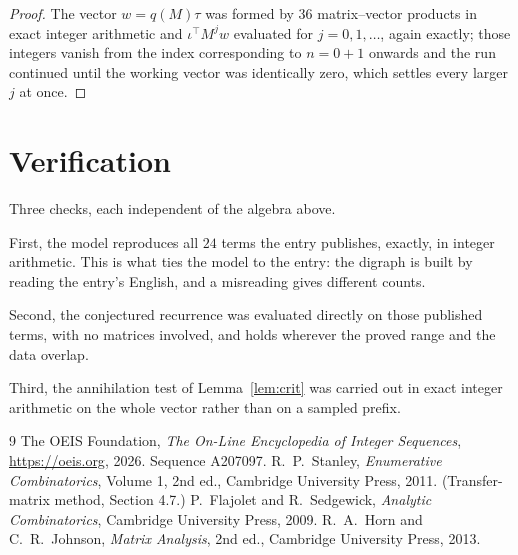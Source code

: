 \documentclass[11pt,a4paper]{article}
\theoremstyle{plain}
\theoremstyle{definition}
\begin{document}
\begin{proof}
The vector $w=q(M)\tau$ was formed by $36$ matrix--vector products in exact integer
arithmetic and $\iota^{\!\top}M^{j}w$ evaluated for $j=0,1,\dots$, again exactly; those
integers vanish from the index corresponding to $n=0+1$ onwards and the run continued
until the working vector was identically zero, which settles every larger $j$ at once.
\end{proof}

\section{Verification}

Three checks, each independent of the algebra above.

First, the model reproduces all $24$ terms the entry publishes, exactly, in integer
arithmetic. This is what ties the model to the entry: the digraph is built by reading the
entry's English, and a misreading gives different counts.

Second, the conjectured recurrence was evaluated directly on those published terms, with no
matrices involved, and holds wherever the proved range and the data overlap.

Third, the annihilation test of Lemma~\ref{lem:crit} was carried out in exact integer
arithmetic on the whole vector rather than on a sampled prefix.

\begin{thebibliography}{9}
 The OEIS Foundation, \emph{The On-Line Encyclopedia of Integer
Sequences}, \url{https://oeis.org}, 2026. Sequence A207097.
 R.~P.~Stanley, \emph{Enumerative Combinatorics}, Volume 1, 2nd ed.,
Cambridge University Press, 2011. (Transfer-matrix method, Section 4.7.)
 P.~Flajolet and R.~Sedgewick, \emph{Analytic Combinatorics}, Cambridge
University Press, 2009.
 R.~A.~Horn and C.~R.~Johnson, \emph{Matrix Analysis}, 2nd ed., Cambridge
University Press, 2013.
\end{thebibliography}
\end{document}
